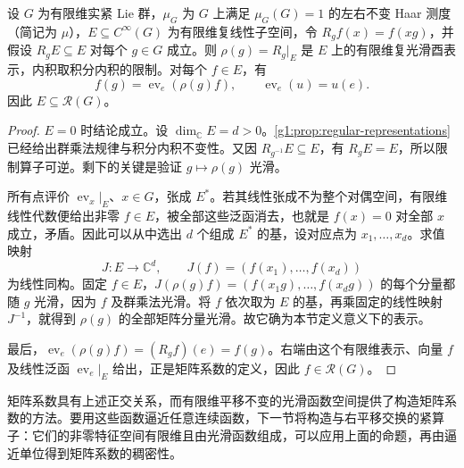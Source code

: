 \begin{proposition}\label{g1:prop:finite-regular-subspace-coefficients}
	设 \(G\) 为有限维实紧 Lie 群，\(\mu_G\) 为 \(G\) 上满足 \(\mu_G(G)=1\) 的左右不变 Haar 测度（简记为 \(\mu\)），\(E\subseteq C^\infty(G)\) 为有限维复线性子空间，令 \(R_gf(x)=f(xg)\)，并假设 \(R_gE\subseteq E\) 对每个 \(g\in G\) 成立。则 \(\rho(g)=R_g|_E\) 是 \(E\) 上的有限维复光滑酉表示，内积取积分内积的限制。对每个 \(f\in E\)，有
	\begin{equation}\label{g1:eq:evaluation-recovers-coefficient}
		f(g)=\operatorname{ev}_e(\rho(g)f),\qquad
		\operatorname{ev}_e(u)=u(e).
	\end{equation}
	因此 \(E\subseteq\mathcal R(G)\)。
\end{proposition}
\begin{proof}
	\(E=0\) 时结论成立。设 \(\dim_{\mathbb C}E=d>0\)。\cref{g1:prop:regular-representations}已经给出群乘法规律与积分内积不变性。又因 \(R_{g^{-1}}E\subseteq E\)，有 \(R_gE=E\)，所以限制算子可逆。剩下的关键是验证 \(g\mapsto\rho(g)\) 光滑。

	所有点评价 \(\operatorname{ev}_x|_E\)、\(x\in G\)，张成 \(E^*\)。若其线性张成不为整个对偶空间，有限维线性代数便给出非零 \(f\in E\)，被全部这些泛函消去，也就是 \(f(x)=0\) 对全部 \(x\) 成立，矛盾。因此可以从中选出 \(d\) 个组成 \(E^*\) 的基，设对应点为 \(x_1,\ldots,x_d\)。求值映射
	\[
		J:E\longrightarrow\mathbb C^d,
		\qquad J(f)=(f(x_1),\ldots,f(x_d))
	\]
	为线性同构。固定 \(f\in E\)，\(J(\rho(g)f)=(f(x_1g),\ldots,f(x_dg))\) 的每个分量都随 \(g\) 光滑，因为 \(f\) 及群乘法光滑。将 \(f\) 依次取为 \(E\) 的基，再乘固定的线性映射 \(J^{-1}\)，就得到 \(\rho(g)\) 的全部矩阵分量光滑。故它确为本节定义意义下的表示。

	最后，\(\operatorname{ev}_e(\rho(g)f)=(R_gf)(e)=f(g)\)。右端由这个有限维表示、向量 \(f\) 及线性泛函 \(\operatorname{ev}_e|_E\) 给出，正是矩阵系数的定义，因此 \(f\in\mathcal R(G)\)。
\end{proof}

矩阵系数具有上述正交关系，而有限维平移不变的光滑函数空间提供了构造矩阵系数的方法。要用这些函数逼近任意连续函数，下一节将构造与右平移交换的紧算子：它们的非零特征空间有限维且由光滑函数组成，可以应用上面的命题，再由逼近单位得到矩阵系数的稠密性。
